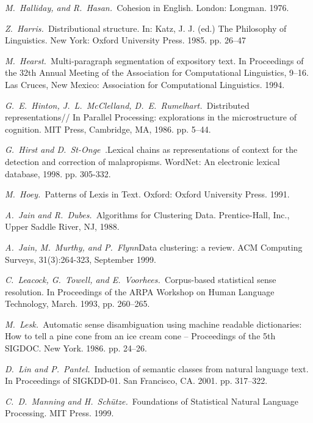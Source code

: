 \documentclass{article}
\begin{document}
\begin{articletext}
\begin{thebibliography}{9}
\textit{M.~Halliday, and R.~Hasan.~}Cohesion in English. London: Longman. 1976. 

\textit{Z.~Harris.~}Distributional structure. In: Katz, J. J. (ed.) The Philosophy of Linguistics. New York: Oxford University Press. 1985. pp. 26–47

\textit{M.~Hearst.~}Multi-paragraph segmentation of expository text. In Proceedings of the 32th Annual Meeting of the Association for Computational Linguistics, 9–16. Las Cruces, New Mexico: Association for Computational Linguistics. 1994. 

\textit{G.~E.~Hinton, J.~L.~McClelland, D.~E.~Rumelhart.~}Distributed representations// In Parallel Processing: explorations in the microstructure of cognition. MIT Press, Cambridge, MA, 1986. pp. 5–44.

\textit{G.~Hirst and D.~St-Onge~.}Lexical chains as representations of context for the detection and correction of malapropisms. WordNet: An electronic lexical database, 1998. pp. 305-332.

\textit{M.~Hoey.~}Patterns of Lexis in Text. Oxford: Oxford University Press. 1991. 

\textit{A.~Jain and R.~Dubes.~}Algorithms for Clustering Data. Prentice-Hall, Inc., Upper Saddle River, NJ, 1988.

\textit{A.~Jain, M.~Murthy, and P.~Flynn}Data clustering: a review. ACM Computing Surveys, 31(3):264-323, September 1999.

\textit{C.~Leacock, G.~Towell, and E.~Voorhees.~}Corpus-based statistical sense resolution. In Proceedings of the ARPA Workshop on Human Language Technology, March. 1993, pp. 260–265.  

\textit{M.~Lesk.~}Automatic sense disambiguation using machine readable dictionaries: How to tell a pine cone from an ice cream cone --  Proceedings  of  the 5th SIGDOC. New York. 1986. pp. 24–26. 

\textit{D.~Lin and P.~Pantel.~}Induction of semantic classes from natural language text. In Proceedings of SIGKDD-01. San Francisco, CA. 2001. pp. 317–322.   

\textit{C.~D.~Manning and H.~Sch\"utze.~}Foundations of Statistical Natural Language Processing. MIT Press. 1999.


\end{thebibliography}
\end{articletext}
\end{document}
